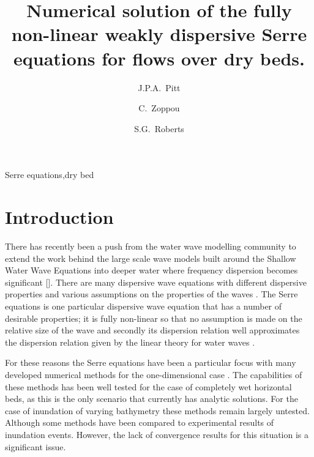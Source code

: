 \documentclass[times]{elsarticle}
\begin{document}
\title{Numerical solution of the fully non-linear weakly dispersive Serre equations for flows over dry beds.}

\author[ANU]{J.P.A.~Pitt}
\author[ANU]{C.~Zoppou}
\author[ANU]{S.G.~Roberts}

\address[ANU]{Mathematical Sciences Institute, Australian National University, Canberra, ACT 0200, Australia}
 
 \begin{abstract}

 \end{abstract}	
 
  \begin{keyword}
  	Serre equations\sep dry bed
  \end{keyword}
  
 \maketitle
\linenumbers
\section{Introduction} \label{intro} 


There has recently been a push from the water wave modelling community to extend the work behind the large scale wave models built around the Shallow Water Wave Equations \cite{ANUGA,Comcot,ClawPack} into deeper water where frequency dispersion becomes significant []. There are many dispersive wave equations with different dispersive properties and various assumptions on the properties of the waves \cite{Bonneton-Lannes-2009-16601}. The Serre equations is one particular dispersive wave equation that has a number of desirable properties; it is fully non-linear so that no assumption is made on the relative size of the wave and secondly its dispersion relation well approximates the dispersion relation given by the linear theory for water waves \cite{Barthelemy-2004-315}. 

For these reasons the Serre equations have been a particular focus with many developed numerical methods for the one-dimensional case \cite{Hank-etal-2010-2034,Dutykh-etal-2013-761,Mitsotakis-etal-2014,Li-2014-169,Filippini-etal-2016-381,Zoppou-etal-2017,doCarmo-etal-2018-404}. The capabilities of these methods has been well tested for the case of completely wet horizontal beds, as this is the only scenario that currently has analytic solutions. For the case of inundation of varying bathymetry these methods remain largely untested. Although some methods \cite{Li-2014-169,Filippini-etal-2016-381} have been compared to experimental results of inundation events. However, the lack of convergence results for this situation is a significant issue. 
\end{document}

